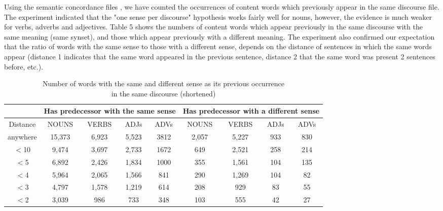 Using the semantic concordance files \cite{Miller93}, we have counted the occurrences of content words which previously appear in the same discourse file. The experiment indicated that the "one sense per discourse" hypothesis works fairly well for nouns, however, the evidence is much weaker for verbs, adverbs and adjectives. Table 5 shows the numbers of content words which appear previously in the same discourse with the same meaning (same synset), and those which appear previously with a different meaning. The experiment also confirmed our expectation that the ratio of words with the same sense to those with a different sense, depends on the distance of sentences in which the same words appear (distance 1 indicates that the same word appeared in the previous sentence, distance 2 that the same word was present 2 sentences before, etc.).



\begin{table}[t]
  \leavevmode
    \caption{Number of words with the same and different sense as its previous occurrence\\ in the same discourse (shortened)}
    \label{tab:5}
  \begin{center}
\begin{tabular}[c]{|c|c|c|c|c|c|c|c|c|}\hline
& \multicolumn{4}{|c|}{Has predecessor with the same sense} &
\multicolumn{4}{|c|}{Has predecessor with a different sense}\\\hline
Distance & NOUNS & VERBS & ADJs & ADVs & NOUNS & VERBS & ADJs & ADVs \\\hline
 anywhere & 15,373 & 6,923 & 5,523 & 3812 & 2,057 & 5,227 & 933 & 830 \\\hline
 $<$10 & 9,474 & 3,697 & 2,733 & 1672 & 649 & 2,521 & 258 & 214 \\\hline
 $<$5 & 6,892 & 2,426 & 1,834 & 1000 & 355 & 1,561 & 104 & 135 \\\hline
 $<$4 & 5,964 & 2,065 & 1,566 & 841 & 290 & 1,269 & 104 & 82 \\\hline
 $<$3 & 4,797 & 1,578 & 1,219 & 614 & 208 & 929 & 83 & 55 \\\hline
 $<$2 & 3,039 & 986 & 733 & 348 & 103 & 555 & 42 & 27\\\hline
\end{tabular}
\end{center}
\end{table}


